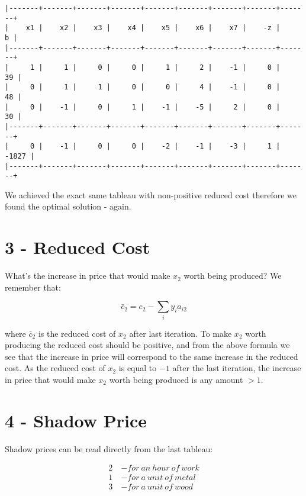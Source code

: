 \documentclass[
  letterpaper,
  DIV=11,
  numbers=noendperiod]{scrartcl}
\begin{document}
\begin{verbatim}
|-------+-------+-------+-------+-------+-------+-------+-------+-------+
|    x1 |    x2 |    x3 |    x4 |    x5 |    x6 |    x7 |    -z |     b |
|-------+-------+-------+-------+-------+-------+-------+-------+-------+
|     1 |     1 |     0 |     0 |     1 |     2 |    -1 |     0 |    39 |
|     0 |     1 |     1 |     0 |     0 |     4 |    -1 |     0 |    48 |
|     0 |    -1 |     0 |     1 |    -1 |    -5 |     2 |     0 |    30 |
|-------+-------+-------+-------+-------+-------+-------+-------+-------+
|     0 |    -1 |     0 |     0 |    -2 |    -1 |    -3 |     1 | -1827 |
|-------+-------+-------+-------+-------+-------+-------+-------+-------+
\end{verbatim}

We achieved the exact same tableau with non-positive reduced cost
therefore we found the optimal solution - again.

\newpage

\section{3 - Reduced Cost}\label{reduced-cost}

What's the increase in price that would make \(x_2\) worth being
produced? \newline We remember that:

\[
\bar{c}_2 = c_2 - \sum_{i}{y_i a_{i2}}
\]

where \(\bar{c}_2\) is the reduced cost of \(x_2\) after last iteration.
\newline To make \(x_2\) worth producing the reduced cost should be
positive, and from the above formula we see that the increase in price
will correspond to the same increase in the reduced cost. As the reduced
cost of \(x_2\) is equal to \(-1\) after the last iteration, the
increase in price that would make \(x_2\) worth being produced is any
amount \(> 1\).

\newpage

\section{4 - Shadow Price}\label{shadow-price}

Shadow prices can be read directly from the last tableau:

\[
\begin{aligned}
2 \ & - for \ an \ hour \ of \ work \\
1 \ & - for \ a \ unit \ of \ metal \\
3 \ & - for \ a \ unit \ of \ wood
\end{aligned}
\]
\end{document}
